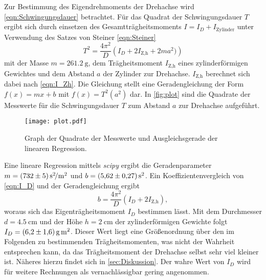 Zur Bestimmung des Eigendrehmoments der Drehachse wird \autoref{eqn:Schwingungsdauer} betrachtet. Für das Quadrat der Schwingungsdauer $T$ ergibt sich
durch einsetzen des Gesamtträgheitsmoments $I = I_D + I_\text{Zylinder}$ unter Verwendung des Satzes von Steiner \eqref{eqn:Steiner}
\begin{equation}
  \label{eqn:I_D}
  T^2 = \frac{4\pi^2}{D}\left(I_D + 2I_\text{Z,h} + 2 m a^2) \right)
\end{equation}
mit der Masse $m = \qty{261.2}{\gram}$, dem Trägheitsmoment $I_\text{Z,h}$ eines zylinderförmigen Gewichtes und dem Abstand $a$ der Zylinder zur Drehachse. $I_\text{Z,h}$
berechnet sich dabei nach \autoref{eqn:I_Zh}.
Die Gleichung stellt eine Geradengleichung der Form $f(x) = mx +b$ mit $f(x) = T^2(a^2)$ dar. In \autoref{fig:plot} sind die 
Quadrate der Messwerte für die Schwingungsdauer $T$ zum Abstand $a$ zur Drehachse aufgeführt. 
\begin{figure}
  \centering
  \texttt{[image: plot.pdf]}
  \caption{Graph der Quadrate der Messwerte und Ausgleichsgerade der linearen Regression. \cite{matplotlib}}
  \label{fig:plot}
\end{figure}
Eine lineare Regression mittels \textit{scipy} \cite{scipy} ergibt die Geradenparameter $m = \qty{732 +- 5}{\second\squared\per\metre\squared}$ und 
$b = \qty{5.62 +- 0.27}{\second\squared}$. Ein Koeffizientenvergleich von \autoref{eqn:I_D} und der Geradengleichung ergibt 
\begin{equation*}
  b = \frac{4\pi^2}{D}(I_D + 2I_\text{Z,h}),
\end{equation*}
woraus sich das Eigenträgheitsmoment $I_D$ bestimmen lässt. Mit dem Durchmesser $d = \qty{4.5}{\centi\metre}$ und der Höhe $h = \qty{2}{\centi\metre}$ der zylinderförmigen
Gewichte folgt $I_D = \qty{6.2 +- 1.6}{\gram\square\metre}$. Dieser Wert liegt eine Größenordnung über den im Folgenden zu bestimmenden Trägheitsmomenten, was nicht der 
Wahrheit entsprechen kann, da das Trägheitsmoment der Drehachse selbst sehr viel kleiner ist. Näheres hierzu findet sich in \autoref{sec:Diskussion}. Der wahre Wert von
$I_D$ wird für weitere Rechnungen als vernachlässigbar gering angenommen.

